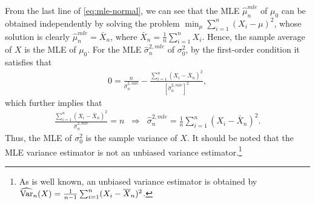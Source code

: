 \documentclass[11pt, A4paper, openany, uplatex]{book}
\begin{document}
\begin{example}
From the last line of \eqref{eq:mle-normal}, we can see that the MLE $\hat{\mu}^{mle}_n$ of $\mu_0$ can be obtained independently by solving the problem $\min_\mu \sum_{i=1}^n (X_i - \mu)^2$, whose solution is clearly $ \hat{\mu}^{mle}_n = \bar X_n$, where $\bar X_n = \frac{1}{n}\sum_{i=1}^n X_i$.
Hence, the sample average of $X$ is the MLE of $\mu_0$.
For the MLE $\hat{\sigma}^{2, mle}_n$ of $\sigma^2_0$, by the first-order condition it satisfies that
\begin{align*}
	0 = \frac{n}{\hat{\sigma}^{2, mle}_n} - \frac{\sum_{i=1}^n (X_i - \bar X_n)^2}{ \left[\hat{\sigma}^{2, mle}_n \right]^2 },
\end{align*}
which further implies that
\begin{align*}
 \frac{\sum_{i=1}^n (X_i - \bar X_n)^2}{ \hat{\sigma}^{2, mle}_n  } = n \;\; \Rightarrow \;\; \hat{\sigma}^{2, mle}_n = \frac{1}{n} \sum_{i=1}^n (X_i - \bar X_n)^2.
\end{align*}
Thus, the MLE of $\sigma_0^2$ is the sample variance of $X$.
It should be noted that the MLE variance estimator is not an unbiased variance estimator.\footnote{
	As is well known, an unbiased variance estimator is obtained by $\widehat{\mathrm{Var}}_n(X) = \frac{1}{n-1}\sum_{i=1}^n (X_i - \overline X_n)^2$.
	}

\end{example}
\end{document}
